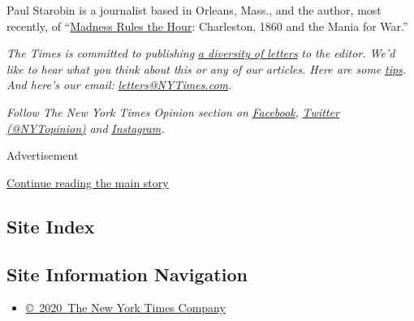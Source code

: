 Paul Starobin is a journalist based in Orleans, Mass., and the author,
most recently, of
``\href{https://www.publicaffairsbooks.com/titles/paul-starobin/madness-rules-the-hour/9781610396233/}{Madness
Rules the Hour}: Charleston, 1860 and the Mania for War.''

\emph{The Times is committed to publishing}
\href{https://www.nytimes3xbfgragh.onion/2019/01/31/opinion/letters/letters-to-editor-new-york-times-women.html}{\emph{a
diversity of letters}} \emph{to the editor. We'd like to hear what you
think about this or any of our articles. Here are some}
\href{https://help.nytimes3xbfgragh.onion/hc/en-us/articles/115014925288-How-to-submit-a-letter-to-the-editor}{\emph{tips}}\emph{.
And here's our email:}
\href{mailto:letters@NYTimes.com}{\emph{letters@NYTimes.com}}\emph{.}

\emph{Follow The New York Times Opinion section on}
\href{https://www.facebookcorewwwi.onion/nytopinion}{\emph{Facebook}}\emph{,}
\href{http://twitter.com/NYTOpinion}{\emph{Twitter (@NYTopinion)}}
\emph{and}
\href{https://www.instagram.com/nytopinion/}{\emph{Instagram}}\emph{.}

Advertisement

\protect\hyperlink{after-bottom}{Continue reading the main story}

\hypertarget{site-index}{%
\subsection{Site Index}\label{site-index}}

\hypertarget{site-information-navigation}{%
\subsection{Site Information
Navigation}\label{site-information-navigation}}

\begin{itemize}
\tightlist
\item
  \href{https://help.nytimes3xbfgragh.onion/hc/en-us/articles/115014792127-Copyright-notice}{©~2020~The
  New York Times Company}
\end{itemize}

